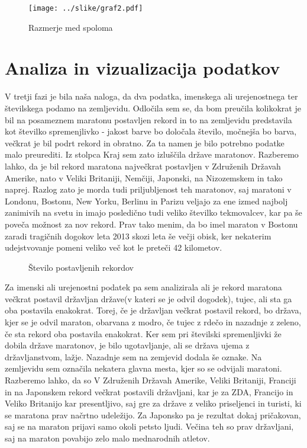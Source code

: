 \documentclass[11pt,a4paper]{article}
\begin{document}
\begin{figure}[H]
  \texttt{[image: ../slike/graf2.pdf]}
  \caption{Razmerje med spoloma}
  \label{fig:Slika 2}
\end{figure}

\newpage
\section{Analiza in vizualizacija podatkov}

V tretji fazi je bila naša naloga, da dva podatka, imenskega ali urejenostnega ter številskega podamo na zemljevidu. 
Odločila sem se, da bom preučila kolikokrat je bil na posameznem maratonu postavljen rekord in to na zemljevidu predstavila kot številko spremenjlivko - jakost barve bo določala število, močnejša bo barva, večkrat je bil podrt rekord in obratno. Za ta namen je bilo potrebno podatke malo preurediti. Iz stolpca Kraj sem zato izluščila države maratonov. 
Razberemo lahko, da je bil rekord maratona največkrat postavljen v Združenih Državah Amerike, nato v Veliki Britaniji, Nemčiji, Japonski, na Nizozemskem in tako naprej. Razlog zato je morda tudi priljubljenost teh maratonov, saj maratoni v Londonu, Bostonu, New Yorku, Berlinu in Parizu veljajo za ene izmed najbolj zanimivih na svetu in imajo posledično tudi veliko številko tekmovalcev, kar pa še poveča možnost za nov rekord. Prav tako menim, da bo imel maraton v Bostonu zaradi tragičnih dogokov leta 2013 skozi leta še večji obisk, ker nekaterim udejstvovanje pomeni veliko več kot le preteči 42 kilometov.

\begin{figure}[H]
  \caption{Število postavljenih rekordov}
  \label{fig:Zemljevid 1}
\end{figure}

Za imenski ali urejenostni podatek pa sem analizirala ali je rekord maratona večkrat postavil državljan države(v kateri se je odvil dogodek), tujec, ali sta ga oba postavila enakokrat. Torej, če je državljan večkrat postavil rekord, bo država, kjer se je odvil maraton, obarvana z modro, če tujec z rdečo in nazadnje z zeleno, če sta rekord oba postavila enakokrat.
Ker sem pri številski spremenljivki že dobila države maratonov, je bilo ugotavljanje, ali se država ujema z državljanstvom, lažje.
Nazadnje sem na zemjevid dodala še oznake. Na zemljevidu sem označila nekatera glavna mesta, kjer so se odvijali maratoni.
Razberemo lahko, da so V Združenih Državah Amerike, Veliki Britaniji, Franciji in na Japonskem rekord večkrat postavili državljani, kar je za ZDA, Francijo in Veliko Britanijo kar presentljivo, saj gre za države z veliko priseljenci in turisti, ki se maratona prav načrtno udeležijo. 
Za Japonsko pa je rezultat dokaj pričakovan, saj se na maraton prijavi samo okoli petsto ljudi. Večina teh so prav državljani, saj na maraton povabijo zelo malo mednarodnih atletov.
\end{document}
